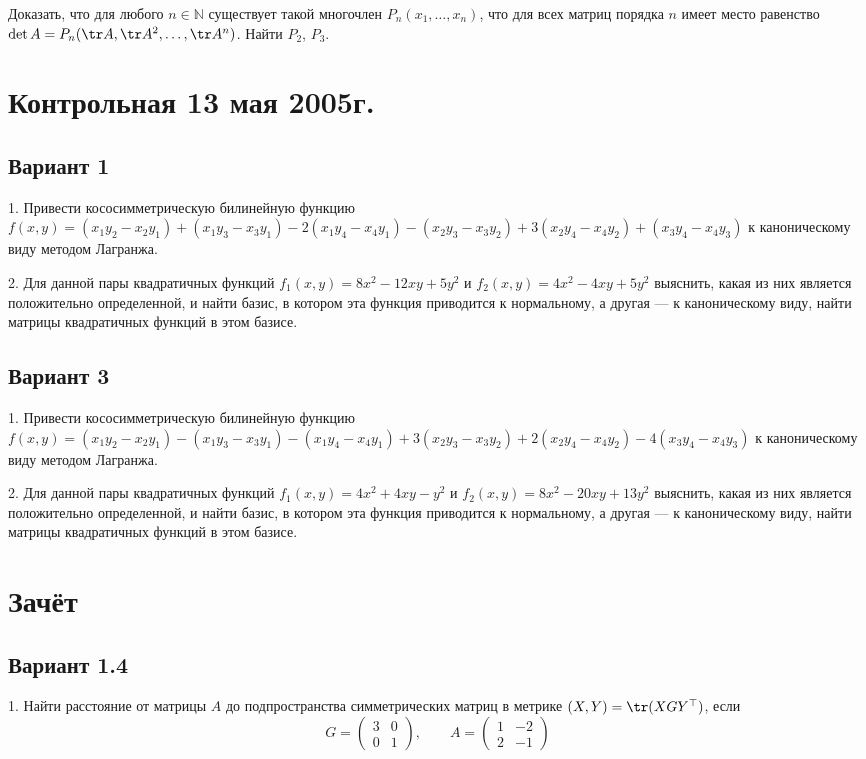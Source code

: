 \documentclass[a4paper]{article}
\begin{document}
Доказать, что для любого $n\in \mathbb{N}$ существует такой
многочлен $P_n(x_1, \ldots, x_n)$, что для всех матриц порядка $n$
имеет место равенство $\det A=P_n(\tr A, \tr A^2,\ldots, \tr
A^n)$. Найти $P_2$, $P_3$.

\section{Контрольная 13 мая 2005г.}

\subsection{Вариант 1}

1. Привести кососимметрическую билинейную функцию $f(x,
y)=(x_1y_2-x_2y_1)+(x_1y_3-x_3y_1)-2(x_1y_4-x_4y_1)-(x_2y_3-x_3y_2)+3(x_2y_4-x_4y_2)+(x_3y_4-x_4y_3)$
к каноническому виду методом Лагранжа.

2. Для данной пары квадратичных функций $f_1(x, y)=8x^2-12xy+5y^2$
и $f_2(x, y)=4x^2-4xy+5y^2$ выяснить, какая из них является
положительно определенной, и найти базис, в котором эта функция
приводится к нормальному, а другая
--- к каноническому виду, найти матрицы квадратичных функций в
этом базисе.

\subsection{Вариант 3}

1. Привести кососимметрическую билинейную функцию $f(x,
y)=(x_1y_2-x_2y_1)-(x_1y_3-x_3y_1)-(x_1y_4-x_4y_1)+3(x_2y_3-x_3y_2)+2(x_2y_4-x_4y_2)-4(x_3y_4-x_4y_3)$
к каноническому виду методом Лагранжа.

2. Для данной пары квадратичных функций $f_1(x, y)=4x^2+4xy-y^2$ и
$f_2(x, y)=8x^2-20xy+13y^2$ выяснить, какая из них является
положительно определенной, и найти базис, в котором эта функция
приводится к нормальному, а другая
--- к каноническому виду, найти матрицы квадратичных функций в
этом базисе.

\section{Зачёт }

\subsection{Вариант 1.4}

1. Найти расстояние от матрицы $A$ до подпространства
симметрических матриц в мет\-ри\-ке $(X, Y)=\tr (XGY^\top)$, если
$$
G=\left(\begin{array}{rr} 3 & 0\\
0 & 1
\end{array}\right) ,\qquad
A=\left(
\begin{array}{rr} 1 & -2\\
2 & -1
\end{array}\right)
$$
\end{document}
